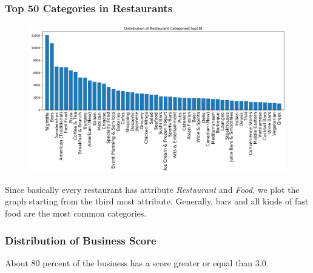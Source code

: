 \documentclass[12pt]{article}
\begin{document}
\subsubsection{Top 50 Categories in Restaurants}
\begin{figure}[H]
\begin{center}
    \includegraphics[width=1.0\textwidth]{../05_dataMining/distributionRestaurants.png}
\end{center}
\end{figure}
Since basically every restaurant has attribute {\it Restaurant} and {\it Food}, we plot the graph starting from the third most attribute. Generally, bars and all kinds of fast food are the most common categories.

\subsubsection{Distribution of Business Score}
\begin{figure}[H]
\captionsetup[subfigure]{labelformat=empty}
\centering
{}
\end{figure}
About 80 percent of the business has a score greater or equal than 3.0.
\end{document}
